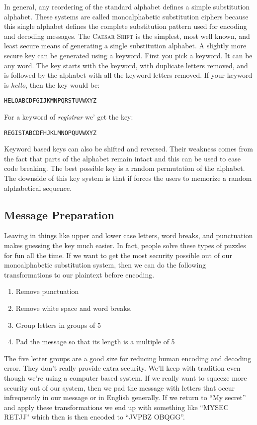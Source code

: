 \documentclass[]{tufte-handout}
\begin{document}
In general, any reordering of the standard alphabet defines a simple substitution alphabet. These systems are called monoalphabetic substitution ciphers because this single alphabet defines the complete substitution pattern used for encoding and decoding messages.  The \textsc{Caesar Shift} is the simplest, most well known, and least secure means of generating a single substitution alphabet.  A slightly more secure key can be generated using a keyword. First you pick a keyword. It can be any word. The key starts with the keyword, with duplicate letters removed, and is followed by the alphabet with all the keyword letters removed.  If your keyword is \textit{hello}, then the key would be:
\begin{verbatim}
HELOABCDFGIJKMNPQRSTUVWXYZ
\end{verbatim}
For a keyword of \textit{registrar} we' get the key:
\begin{verbatim}
REGISTABCDFHJKLMNOPQUVWXYZ
\end{verbatim}
Keyword based keys can also be shifted and reversed. Their weakness comes from the fact that parts of the alphabet remain intact and this can be used to ease code breaking.  The best possible key is a random permutation of the alphabet. The downside of this key system is that if forces the users to memorize a random alphabetical sequence.  

\subsection*{Message Preparation}

Leaving in things like upper and lower case letters, word breaks, and punctuation makes guessing the key much easier. In fact, people solve these types of puzzles for fun all the time. If we want to get the most security possible out of our monoalphabetic substitution system, then we can do the following transformations to our plaintext before encoding.
\begin{enumerate}
\item Remove punctuation
\item Remove white space and word breaks.
\item Group letters in groups of 5
\item Pad the message so that its length is a multiple of 5
\end{enumerate}
The five letter groups are a good size for reducing human encoding and decoding error.  They don't really provide extra security. We'll keep with tradition even though we're using a computer based system. If we really want to squeeze more security out of our system, then we pad the message with letters that occur infrequently in our message or in English generally. If we return to ``My secret'' and apply these transformations we end up with something like ``MYSEC RETJJ'' which then is then encoded to ``JVPBZ OBQGG''.    
\end{document}
